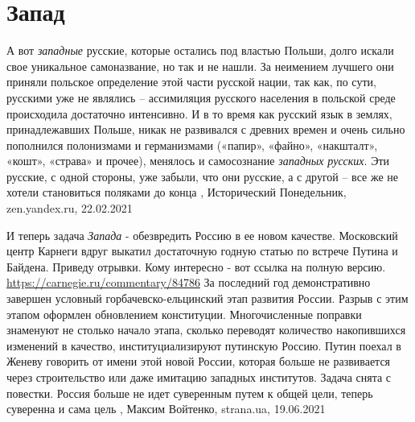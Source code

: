  
 
 
 
 
\chapter{Запад}
\label{sec:slova.zapad}

А вот \emph{западные} русские, которые остались под властью Польши, долго искали свое
уникальное самоназвание, но так и не нашли. За неимением лучшего они приняли
польское определение этой части русской нации, так как, по сути, русскими уже
не являлись – ассимиляция русского населения в польской среде происходила
достаточно интенсивно. И в то время как русский язык в землях, принадлежавших
Польше, никак не развивался с древних времен и очень сильно пополнился
полонизмами и германизмами («папир», «файно», «накшталт», «кошт», «страва» и
прочее), менялось и самосознание \emph{западных русских}. Эти русские, с одной
стороны, уже забыли, что они русские, а с другой – все же не хотели становиться
поляками до конца
, 
Исторический Понедельник, zen.yandex.ru, 22.02.2021 


И теперь задача \emph{Запада} - обезвредить Россию в ее новом качестве.  Московский
центр Карнеги вдруг выкатил достаточную годную статью по встрече Путина и
Байдена. Приведу отрывки. Кому интересно - вот ссылка на полную версию.
\url{https://carnegie.ru/commentary/84786} За последний год демонстративно
завершен условный горбачевско-ельцинский этап развития России. Разрыв с этим
этапом оформлен обновлением конституции. Многочисленные поправки знаменуют не
столько начало этапа, сколько переводят количество накопившихся изменений в
качество, институциализируют путинскую Россию. Путин поехал в Женеву говорить
от имени этой новой России, которая больше не развивается через строительство
или даже имитацию западных институтов. Задача снята с повестки. Россия больше
не идет суверенным путем к общей цели, теперь суверенна и сама цель
, 
Максим Войтенко, strana.ua, 19.06.2021

